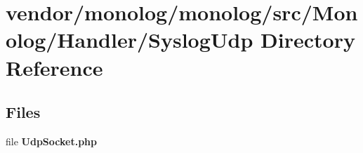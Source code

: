 \section{vendor/monolog/monolog/src/\+Monolog/\+Handler/\+Syslog\+Udp Directory Reference}
\label{dir_aa5cc332689cac63a30f7bc63780a1eb}
\subsection*{Files}
\begin{DoxyCompactItemize}
\item 
file {\bf Udp\+Socket.\+php}
\end{DoxyCompactItemize}
